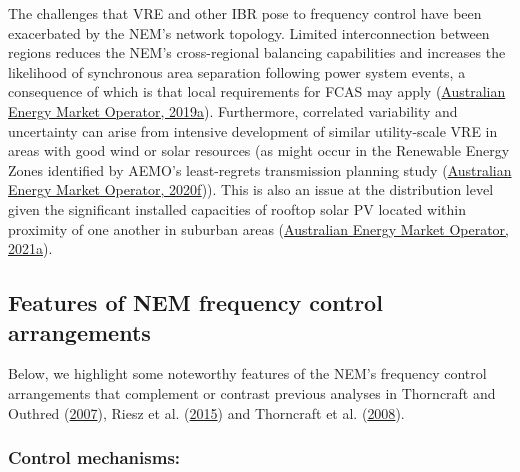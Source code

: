 \documentclass[12pt,a4paper,]{report}
\begin{document}
The challenges that VRE and other IBR pose to frequency control have
been exacerbated by the NEM's network topology. Limited interconnection
between regions reduces the NEM's cross-regional balancing capabilities
and increases the likelihood of synchronous area separation following
power system events, a consequence of which is that local requirements
for FCAS may apply
(\protect\hyperlink{ref-australianenergymarketoperatorMaintainingPowerSystem2019}{Australian
Energy Market Operator, 2019a}). Furthermore, correlated variability and
uncertainty can arise from intensive development of similar
utility-scale VRE in areas with good wind or solar resources (as might
occur in the Renewable Energy Zones identified by AEMO's least-regrets
transmission planning study
(\protect\hyperlink{ref-australianenergymarketoperator2020IntegratedSystem2020}{Australian
Energy Market Operator, 2020f})). This is also an issue at the
distribution level given the significant installed capacities of rooftop
solar PV located within proximity of one another in suburban areas
(\protect\hyperlink{ref-australianenergymarketoperatorEnduringPrimaryFrequency2021}{Australian
Energy Market Operator, 2021a}).

\hypertarget{features-of-nem-frequency-control-arrangements}{%
\subsection{Features of NEM frequency control
arrangements}\label{features-of-nem-frequency-control-arrangements}}

Below, we highlight some noteworthy features of the NEM's frequency
control arrangements that complement or contrast previous analyses in
Thorncraft and Outhred
(\protect\hyperlink{ref-thorncraftExperienceMarketbasedAncillary2007}{2007}),
Riesz et al.
(\protect\hyperlink{ref-rieszFrequencyControlAncillary2015}{2015}) and
Thorncraft et al.
(\protect\hyperlink{ref-thorncraftMarketbasedAncillaryServices2008}{2008}).

\hypertarget{control-mechanisms}{%
\subsubsection{Control mechanisms:}\label{control-mechanisms}}
\end{document}
